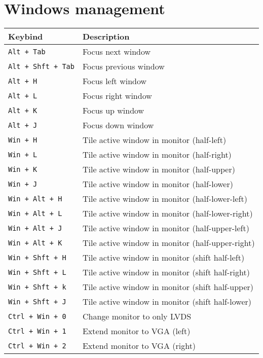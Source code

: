 \documentclass[letterpaper,12pt]{article}
\begin{document}
\section*{Windows management}
\begin{table}[H]
  \begin{tabular}{|C{5cm}|L{10cm}|}
    \hline
    \textbf{Keybind} & \textbf{Description} \\
    \hline
    {\tt Alt + Tab} & Focus next window \\
    {\tt Alt + Shft + Tab} & Focus previous window \\
    {\tt Alt + H} & Focus left window \\
    {\tt Alt + L} & Focus right window \\
    {\tt Alt + K} & Focus up window \\
    {\tt Alt + J} & Focus down window \\
    \hline
    {\tt Win + H} & Tile active window in monitor (half-left) \\
    {\tt Win + L} & Tile active window in monitor (half-right) \\
    {\tt Win + K} & Tile active window in monitor (half-upper) \\
    {\tt Win + J} & Tile active window in monitor (half-lower) \\
    {\tt Win + Alt + H} & Tile active window in monitor (half-lower-left) \\
    {\tt Win + Alt + L} & Tile active window in monitor (half-lower-right) \\
    {\tt Win + Alt + J} & Tile active window in monitor (half-upper-left) \\
    {\tt Win + Alt + K} & Tile active window in monitor (half-upper-right) \\
    {\tt Win + Shft + H} & Tile active window in monitor (shift half-left) \\
    {\tt Win + Shft + L} & Tile active window in monitor (shift half-right) \\
    {\tt Win + Shft + k} & Tile active window in monitor (shift half-upper) \\
    {\tt Win + Shft + J} & Tile active window in monitor (shift half-lower) \\
    \hline
    {\tt Ctrl + Win + 0} & Change monitor to only LVDS \\
    {\tt Ctrl + Win + 1} & Extend monitor to VGA (left) \\
    {\tt Ctrl + Win + 2} & Extend monitor to VGA (right) \\

\end{tabular}
\end{table}
\end{document}

